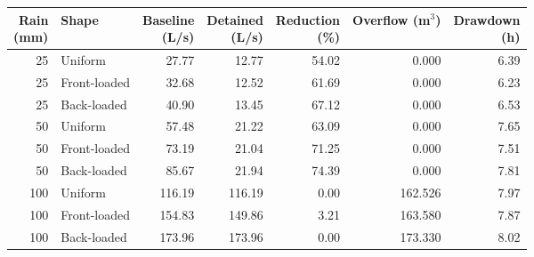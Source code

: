 \begin{tabular}{rlrrrrr}
\toprule
\shortstack{Rain\\(mm)} & Shape & \shortstack{Baseline\\(L/s)} & \shortstack{Detained\\(L/s)} & \shortstack{Reduction\\(\%)} & \shortstack{Overflow\\(m$^3$)} & \shortstack{Drawdown\\(h)} \\
\midrule
25 & Uniform & 27.77 & 12.77 & 54.02 & 0.000 & 6.39 \\
25 & Front-loaded & 32.68 & 12.52 & 61.69 & 0.000 & 6.23 \\
25 & Back-loaded & 40.90 & 13.45 & 67.12 & 0.000 & 6.53 \\
50 & Uniform & 57.48 & 21.22 & 63.09 & 0.000 & 7.65 \\
50 & Front-loaded & 73.19 & 21.04 & 71.25 & 0.000 & 7.51 \\
50 & Back-loaded & 85.67 & 21.94 & 74.39 & 0.000 & 7.81 \\
100 & Uniform & 116.19 & 116.19 & 0.00 & 162.526 & 7.97 \\
100 & Front-loaded & 154.83 & 149.86 & 3.21 & 163.580 & 7.87 \\
100 & Back-loaded & 173.96 & 173.96 & 0.00 & 173.330 & 8.02 \\
\bottomrule
\end{tabular}
